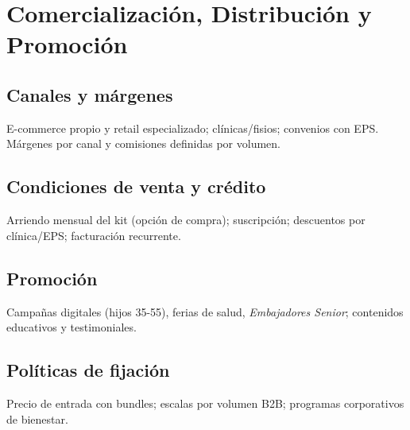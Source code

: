 \section{Comercialización, Distribución y Promoción}
\subsection{Canales y márgenes}
E-commerce propio y retail especializado; clínicas/fisios; convenios con EPS. Márgenes por canal y comisiones definidas por volumen.

\subsection{Condiciones de venta y crédito}
Arriendo mensual del kit (opción de compra); suscripción; descuentos por clínica/EPS; facturación recurrente.

\subsection{Promoción}
Campañas digitales (hijos 35-55), ferias de salud, \emph{Embajadores Senior}; contenidos educativos y testimoniales.

\subsection{Políticas de fijación}
Precio de entrada con bundles; escalas por volumen B2B; programas corporativos de bienestar.
